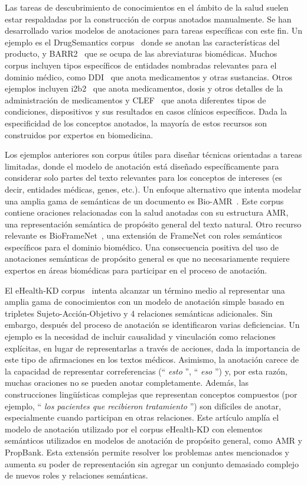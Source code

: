 Las tareas de descubrimiento de conocimientos en el ámbito de la salud suelen estar respaldadas por la construcción de corpus anotados manualmente.
Se han desarrollado varios modelos de anotaciones para tareas específicas con este fin. Un ejemplo es el {DrugSemantics} corpus~\cite{moreno2017drugsemantics} donde se anotan las características del producto, y {BARR2}~\cite{barr2} que se ocupa de las abreviaturas biomédicas.
Muchos corpus incluyen tipos específicos de entidades nombradas relevantes para el dominio médico, como {DDI}~\cite{ddi} que anota medicamentos y otras sustancias.
Otros ejemplos incluyen {i2b2}~\cite{i2b2} que anota medicamentos, dosis y otros detalles de la administración de medicamentos y {CLEF}~\cite{clef} que anota diferentes tipos de condiciones, dispositivos y sus resultados en casos clínicos específicos.
Dada la especificidad de los conceptos anotados, la mayoría de estos recursos son construidos por expertos en biomedicina.

Los ejemplos anteriores son corpus útiles para diseñar técnicas orientadas a tareas limitadas,
donde el modelo de anotación está diseñado específicamente para considerar solo partes del texto relevantes para los conceptos de intereses (es decir, entidades médicas, genes, etc.).
Un enfoque alternativo que intenta modelar una amplia gama de semánticas de un documento es {Bio-AMR}~\cite{bioamr}.
Este corpus contiene oraciones relacionadas con la salud anotadas con su estructura AMR, una representación semántica de propósito general del texto natural.
Otro recurso relevante es BioFrameNet~\cite{bioframenet}, una extensión de FrameNet con roles semánticos específicos para el dominio biomédico.
Una consecuencia positiva del uso de anotaciones semánticas de propósito general es que no necesariamente requiere expertos en áreas biomédicas para participar en el proceso de anotación.

El {eHealth-KD} corpus~\cite{martinez2018overview} intenta alcanzar un término medio al representar una amplia gama de conocimientos con un modelo de anotación simple basado en tripletes Sujeto-Acción-Objetivo y 4 relaciones semánticas adicionales.
Sin embargo, después del proceso de anotación se identificaron varias deficiencias.
Un ejemplo es la necesidad de incluir {causalidad} y {vinculación} como relaciones explícitas, en lugar de representarlas a través de acciones, dada la importancia de este tipo de afirmaciones en los textos médicos.
Asimismo, la anotación carece de la capacidad de representar correferencias (`` \textit{esto} '', `` \textit{eso} '') y, por esta razón, muchas oraciones no se pueden anotar completamente.
Además, las construcciones lingüísticas complejas que representan conceptos compuestos (por ejemplo, `` \textit{los pacientes que recibieron tratamiento} '') son difíciles de anotar, especialmente cuando participan en otras relaciones.
Este artículo amplía el modelo de anotación utilizado por el corpus eHealth-KD con elementos semánticos utilizados en modelos de anotación de propósito general, como AMR y PropBank.
Esta extensión permite resolver los problemas antes mencionados y aumenta su poder de representación sin agregar un conjunto demasiado complejo de nuevos roles y relaciones semánticas.

